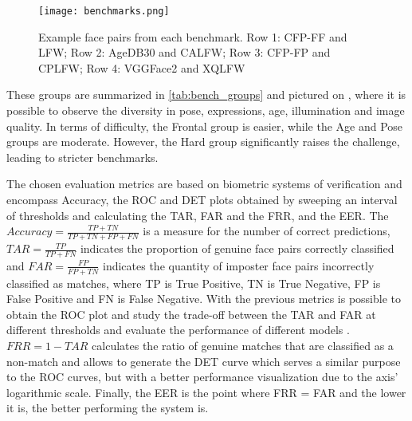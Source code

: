 \documentclass[class=report, crop=false, a4paper, 12pt]{standalone}
\begin{document}
\begin{adjustwidth}{-2cm}{-2cm}
  \begin{figure}[htbp]
    \centering
    \texttt{[image: benchmarks.png]}
    \caption[Example face pairs from each benchmark.]{Example face pairs from each benchmark. Row 1: CFP-FF and LFW; Row 2: AgeDB30 and CALFW; Row 3: CFP-FP and CPLFW; Row 4: VGGFace2 and XQLFW}
    \label{fig:benchmarks}
  \end{figure}
\end{adjustwidth}


These groups are summarized in \autoref{tab:bench_groups} and pictured on , where it is possible to observe the diversity in pose, expressions, age, illumination and image quality. In terms of difficulty, the Frontal group is easier, while the Age and Pose groups are moderate. However, the Hard group significantly raises the challenge, leading to stricter benchmarks.


\par The chosen evaluation metrics are based on biometric systems of verification and encompass Accuracy, the \gls{ROC} and \gls{DET} plots obtained by sweeping an interval of thresholds and calculating the \gls{TAR}, \gls{FAR} and the \gls{FRR}, and the \gls{EER}. The $Accuracy=\frac{TP+TN}{TP+TN+FP+FN}$ is a measure for the number of correct predictions, $TAR=\frac{TP}{TP+FN}$ indicates the proportion of genuine face pairs correctly classified and $FAR=\frac{FP}{FP+TN}$ indicates the quantity of imposter face pairs incorrectly classified as matches, where TP is True Positive, TN is True Negative, FP is False Positive and FN is False Negative. With the previous metrics is possible to obtain the ROC plot and study the trade-off between the TAR and FAR at different thresholds and evaluate the performance of different models . $FRR = 1 - TAR$ calculates the ratio of genuine matches that are classified as a non-match and allows to generate the DET curve which serves a similar purpose to the ROC curves, but with a better performance visualization due to the axis' logarithmic scale. Finally, the EER is the point where FRR = FAR and the lower it is, the better performing the system is. 
\end{document}
